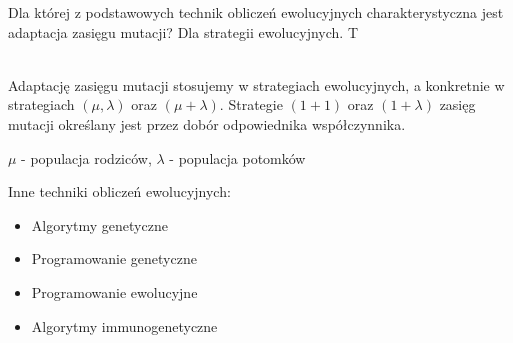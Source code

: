 \answer
{Dla której z podstawowych technik obliczeń ewolucyjnych charakterystyczna jest adaptacja zasięgu mutacji?}
{Dla strategii ewolucyjnych.}
{T}
{}
{ \\
Adaptację zasięgu mutacji stosujemy w strategiach ewolucyjnych, a konkretnie w strategiach $(\mu,\lambda)$ oraz $(\mu+\lambda)$. Strategie $(1+1)$ oraz $(1+\lambda)$ zasięg mutacji określany jest przez dobór odpowiednika współczynnika.
\vspace{0.1cm}

\noindent$\mu$ - populacja rodziców, 
$\lambda$ - populacja potomków
\vspace{0.4cm}

\noindent Inne techniki obliczeń ewolucyjnych:
\begin{itemize}
\item Algorytmy genetyczne
\item Programowanie genetyczne
\item Programowanie ewolucyjne
\item Algorytmy immunogenetyczne
\end{itemize}
}




